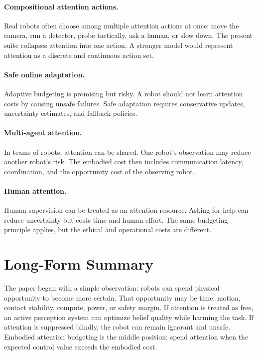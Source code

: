 \documentclass{article}
\begin{document}
\paragraph{Compositional attention actions.}
Real robots often choose among multiple attention actions at once: move the
camera, run a detector, probe tactically, ask a human, or slow down. The
present suite collapses attention into one action. A stronger model would
represent attention as a discrete and continuous action set.

\paragraph{Safe online adaptation.}
Adaptive budgeting is promising but risky. A robot should not learn attention
costs by causing unsafe failures. Safe adaptation requires conservative
updates, uncertainty estimates, and fallback policies.

\paragraph{Multi-agent attention.}
In teams of robots, attention can be shared. One robot's observation may reduce
another robot's risk. The embodied cost then includes communication latency,
coordination, and the opportunity cost of the observing robot.

\paragraph{Human attention.}
Human supervision can be treated as an attention resource. Asking for help can
reduce uncertainty but costs time and human effort. The same budgeting
principle applies, but the ethical and operational costs are different.

\section{Long-Form Summary}

The paper began with a simple observation: robots can spend physical
opportunity to become more certain. That opportunity may be time, motion,
contact stability, compute, power, or safety margin. If attention is treated as
free, an active perception system can optimize belief quality while harming the
task. If attention is suppressed blindly, the robot can remain ignorant and
unsafe. Embodied attention budgeting is the middle position: spend attention
when the expected control value exceeds the embodied cost.
\end{document}
